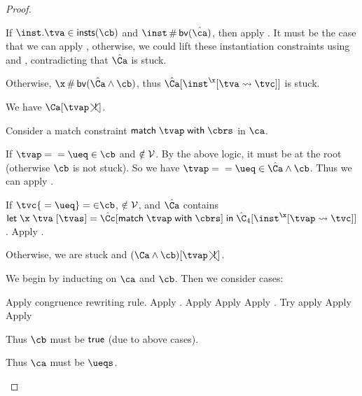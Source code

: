 \documentclass[acmsmall,screen,nonacm,review]{acmart}
\begin{document}
\begin{proof}
\begin{proofcases}
\begin{proofcases}
\begin{proofcases}
	    If $\inst.\tv \in \insts \cb$ and $\inst \disjoint \bvs {\hat\ca}$, then apply .
	    It must be the case that we can apply , otherwise, we could lift these instantiation
	    constraints using  and , contradicting that $\hat\Ca$ is stuck.

	    Otherwise, $\x \disjoint \bvs {\hat \Ca \cand \cb}$, thus $\hat\Ca\where{\cpapp \x \tv \tvc \inst}$ is stuck.

	  \proofcase{$\hat\Ca\where{\cmatch \tvp \cbrs}$}
	    We have $\nCshape \Ca \tvp$.

	    Consider a match constraint $\cmatch \tvp \cbrs$ in $\ca$.

	    If $\cunif \tvp {\cunif \t \ueq} \in \cb$ and $\relax \notin \mathcal{V}$. By the above logic, it must be at the root (otherwise $\cb$
	    is not stuck). So we have $\cunif \tvp {\cunif \t \ueq} \in \hat \Ca \cand \cb$. Thus we can apply .

	    If $\cunif \tvc {\cunif \t \ueq} \in \cb$, $\relax \notin \mathcal{V}$, and $\hat\Ca$ contains $\cletr \x \tv \tvs {\hat\Cc\where{\cmatch \tvp \cbrs}} {\hat\C_4\where{\cpapp \x \tvp \tvc \inst}}$.
	    Apply .

	    Otherwise, we are stuck and $\nCshape {(\Ca \cand \cb)} \tvp$.
	\end{proofcases}

    \end{proofcases}

    \proofcase{$\cletr \x \tv \tvs \ca \cb$}
    We begin by inducting on $\ca$ and $\cb$. Then we consider cases:
    \begin{proofcases}
       Apply congruence rewriting rule.
       Apply .
       Apply 
       Apply 
       Apply .
       Try apply 
       Apply 
       Apply 

	Thus $\cb$ must be $\mathsf{true}$ (due to above cases).
	\begin{proofcases}
	    Thus $\ca$ must be $\ueqs$.


\end{proofcases}
\end{proofcases}
\end{proofcases}
\end{proof}
\end{document}
